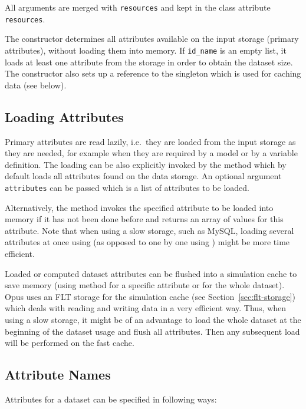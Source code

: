 All arguments are merged with \verb|resources| and kept in the class attribute
\verb|resources|.

The constructor determines all attributes available on the input storage
(primary attributes), without loading them into memory. If \verb|id_name|
is an empty list, it loads at least one attribute from the storage in order to
obtain the dataset size. The constructor also sets up a reference to the
singleton  which is used for caching data (see below).

%
\subsection{Loading Attributes}
%
Primary attributes are read lazily, i.e.\ they are loaded from the input
storage as they are needed, for example when they are required by a model or
by a variable definition. The loading can be also explicitly invoked by the
method  which by default loads all attributes found on
the data storage. An optional argument \verb|attributes| can be passed which
is a list of attributes to be loaded.

Alternatively, the method  invokes the specified
attribute to be loaded into memory if it has not been done before and returns
an array of values for this attribute. Note that when using a slow storage,
such as MySQL, loading several attributes at once using  
(as opposed to one by one using ) might be more
time efficient. 

Loaded or computed dataset attributes can be flushed into a simulation cache to
save memory  (using method
 for a specific attribute or
 for the whole dataset). Opus uses an FLT storage for
the simulation cache (see Section~\ref{sec:flt-storage}) which deals with
reading and writing data in a very efficient way. Thus, when using a slow
storage, it might be of an advantage to load the whole dataset at the beginning
of the dataset usage and flush all attributes. Then any subsequent load will be
performed on the fast cache.

\subsection{Attribute Names}
\label{sec:opus-core-attribute-names}
%
Attributes for a dataset can be specified in following ways:


